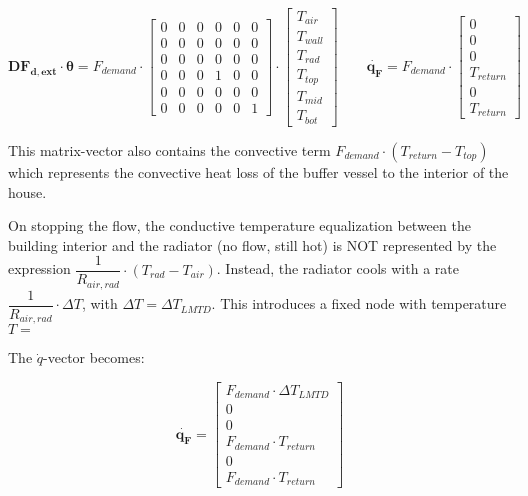 \begin{equation}
	\mathbf{DF_{d, ext}} \cdot \boldsymbol{\theta} = 
	F_{demand} \cdot
	\begin{bmatrix}
		0 & 0 & 0 & 0 & 0 & 0 \\
		0 & 0 & 0 & 0 & 0 & 0 \\
		0 & 0 & 0 & 0 & 0 & 0 \\
		0 & 0 & 0 & 1 & 0 & 0 \\
		0 & 0 & 0 & 0 & 0 & 0 \\
		0 & 0 & 0 & 0 & 0 & 1  
	\end{bmatrix}
	\cdot
	\begin{bmatrix}
		T_{air} \\
		T_{wall} \\
		T_{rad} \\
		T_{top} \\
		T_{mid} \\
		T_{bot}
	\end{bmatrix}
	\qquad
	\mathbf{\dot{q_{F}}} = 
	F_{demand} \cdot
	\begin{bmatrix}
		0 \\
		0 \\
		0 \\
		T_{return}  \\
		0 \\
		T_{return}  
	\end{bmatrix}
\end{equation}

This matrix-vector also contains the convective term $F_{demand} \cdot (T_{return} - T_{top})$ which represents the convective heat loss of the buffer vessel to the interior of the house.

On stopping the flow, the conductive temperature equalization between the building interior and the radiator (no flow, still hot) is NOT represented by the expression $\dfrac{1}{R_{air,rad}} \cdot (T_{rad}-T_{air})$. Instead, the radiator cools with a rate $\dfrac{1}{R_{air,rad}} \cdot \Delta T$, with $\Delta T = \Delta T_{LMTD}$. This introduces a fixed node with temperature $T = $

The $\dot{q}$-vector becomes:

\begin{equation}
	\mathbf{\dot{q_{F}}} = 
	\begin{bmatrix}
		F_{demand} \cdot \Delta T_{LMTD} \\
		0 \\
		0 \\
		F_{demand} \cdot T_{return}  \\
		0 \\
		F_{demand} \cdot T_{return}  
	\end{bmatrix}
\end{equation}

